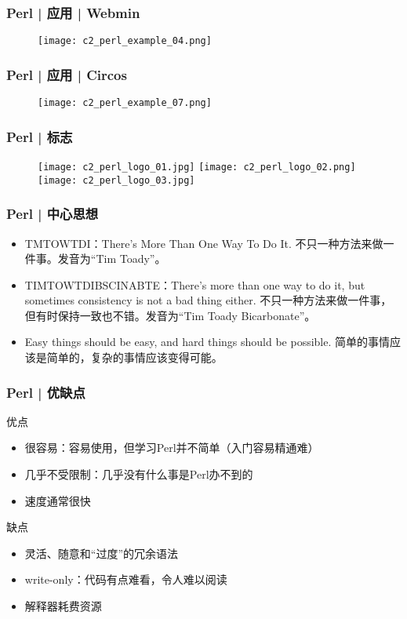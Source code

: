 \begin{frame}
  \frametitle{Perl | 应用 | Webmin}
  \begin{figure}
    \centering
    \texttt{[image: c2\_perl\_example\_04.png]}
  \end{figure}
\end{frame}

\begin{frame}
  \frametitle{Perl | 应用 | Circos}
  \begin{figure}
    \centering
    \texttt{[image: c2\_perl\_example\_07.png]}
  \end{figure}
\end{frame}

\begin{frame}
  \frametitle{Perl | 标志}
  \begin{figure}
    \centering
    \texttt{[image: c2\_perl\_logo\_01.jpg]}
    \hspace{1cm}
    \texttt{[image: c2\_perl\_logo\_02.png]}
    \vspace{0.5cm}
    \texttt{[image: c2\_perl\_logo\_03.jpg]}
  \end{figure}
\end{frame}

\begin{frame}
  \frametitle{Perl | 中心思想}
  \begin{itemize}
    \item \alert{TMTOWTDI}：There's More Than One Way To Do It. 不只一种方法来做一件事。发音为“Tim Toady”。
    \item TIMTOWTDIBSCINABTE：There's more than one way to do it, but sometimes consistency is not a bad thing either.  不只一种方法来做一件事，但有时保持一致也不错。发音为“Tim Toady Bicarbonate”。
    \item Easy things should be easy, and hard things should be possible. 简单的事情应该是简单的，复杂的事情应该变得可能。
  \end{itemize}
\end{frame}

\begin{frame}
  \frametitle{Perl | 优缺点}
  \begin{block}{优点}
    \begin{itemize}
      \item 很容易：容易使用，但学习Perl并不简单（入门容易精通难）
      \item 几乎不受限制：几乎没有什么事是Perl办不到的
      \item 速度通常很快
    \end{itemize}
  \end{block}
  \pause
  \begin{block}{缺点}
    \begin{itemize}
      \item 灵活、随意和“过度”的冗余语法
      \item write-only：代码有点难看，令人难以阅读
      \item 解释器耗费资源
    \end{itemize}
  \end{block}
\end{frame}

